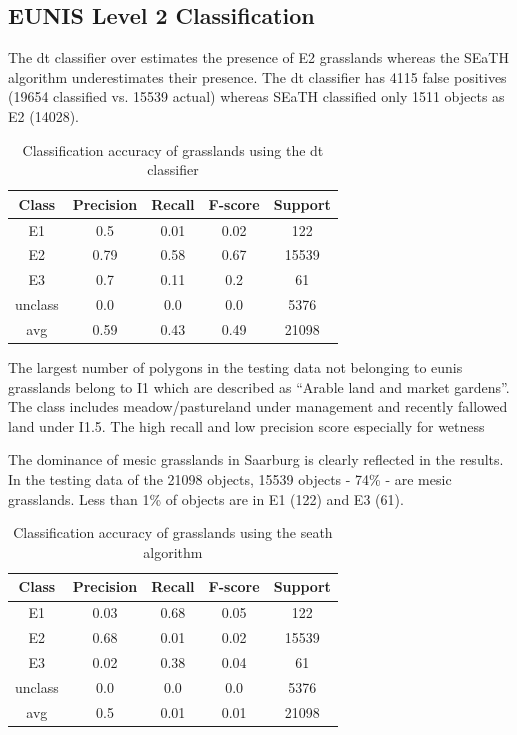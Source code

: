 \documentclass[authoryear,final,12pt,number]{elsarticle}
\begin{document}
\subsection{EUNIS Level 2 Classification}
\label{subsec:level2_classification}
The \gls{dt} classifier over estimates the presence of E2 grasslands whereas 
the SEaTH
algorithm underestimates their presence. The \gls{dt} classifier has 4115 false
positives (19654 classified vs. 15539 actual) whereas SEaTH classified only 1511
objects as E2 (14028). %
\begin{table}
\centering
\begin{tabular}{c c c c c}
Class & Precision & Recall & F-score & Support\\
\hline
E1 & 0.5 & 0.01 & 0.02 & 122\\
E2 & 0.79 & 0.58 & 0.67 & 15539\\
E3 & 0.7 & 0.11 & 0.2 & 61\\
unclass & 0.0 & 0.0 & 0.0 & 5376\\
avg & 0.59 & 0.43 & 0.49 & 21098\\
\end{tabular}
\caption{Classification accuracy of grasslands using the \gls{dt} 
classifier\label{fig:dt_lvl2_classification}}
\end{table}
The largest number of polygons in the testing data not belonging to \gls{eunis}
grasslands belong to I1 which are described as ``Arable land and
market gardens''. The class includes meadow/pastureland under management and
recently fallowed land under I1.5. The high recall and low precision score
especially for wetness 

The dominance of mesic grasslands in Saarburg is clearly reflected in
the results. In the testing data of the 21098 objects, 15539 objects - 74\% -
are mesic grasslands. Less than 1\% of objects are in E1 (122) and E3 (61). 
\begin{table}
\centering
\begin{tabular}{c c c c c}
Class & Precision & Recall & F-score & Support\\
\hline
E1 & 0.03 & 0.68 & 0.05 & 122\\
E2 & 0.68 & 0.01 & 0.02 & 15539\\
E3 & 0.02 & 0.38 & 0.04 & 61\\
unclass & 0.0 & 0.0 & 0.0 & 5376\\
avg & 0.5 & 0.01 & 0.01 & 21098\\
\end{tabular}
\caption{Classification accuracy of grasslands using the \gls{seath}
algorithm\label{fig:seath_lvl2_classification}}
\end{table}
\end{document}
